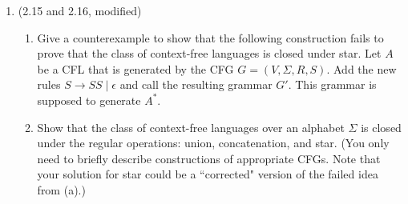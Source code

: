 \documentclass[11pt]{article}
\begin{document}
\begin{enumerate}
\item (2.15 and 2.16, modified) 
\begin{enumerate}
\item Give a counterexample to show that the following construction fails to prove that the class of context-free languages is closed under star. Let $A$ be a CFL that is generated by the CFG $G = (V,\Sigma,R,S)$. Add the new rules $S \to SS \mid \epsilon$ and call the resulting grammar $G'$. This grammar is supposed to generate $A^*$.
\item Show that the class of context-free languages over an alphabet $\Sigma$ is closed under the regular operations: union, concatenation, and star. (You only need to briefly describe constructions of appropriate CFGs. Note that your solution for star could be a ``corrected" version of the failed idea from (a).)
\end{enumerate}
\end{enumerate}
\end{document}
